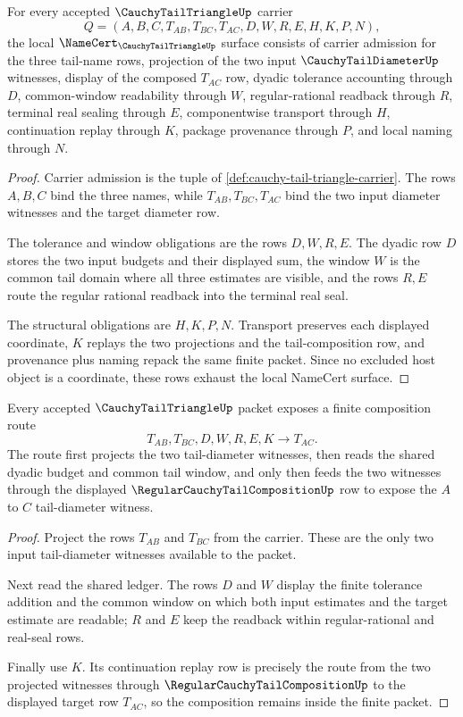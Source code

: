 \begin{theorem}
\label{thm:cauchy-tail-triangle-namecert-obligations}
For every accepted $\CauchyTailTriangleUp$ carrier
$$
Q=(A,B,C,T_{AB},T_{BC},T_{AC},D,W,R,E,H,K,P,N),
$$
the local $\NameCert_{\CauchyTailTriangleUp}$ surface consists of carrier admission for the three tail-name rows, projection of the two input $\CauchyTailDiameterUp$ witnesses, display of the composed $T_{AC}$ row, dyadic tolerance accounting through $D$, common-window readability through $W$, regular-rational readback through $R$, terminal real sealing through $E$, componentwise transport through $H$, continuation replay through $K$, package provenance through $P$, and local naming through $N$.
\end{theorem}
\begin{proof}
Carrier admission is the tuple of \autoref{def:cauchy-tail-triangle-carrier}. The rows $A,B,C$ bind the three names, while $T_{AB},T_{BC},T_{AC}$ bind the two input diameter witnesses and the target diameter row.

The tolerance and window obligations are the rows $D,W,R,E$. The dyadic row $D$ stores the two input budgets and their displayed sum, the window $W$ is the common tail domain where all three estimates are visible, and the rows $R,E$ route the regular rational readback into the terminal real seal.

The structural obligations are $H,K,P,N$. Transport preserves each displayed coordinate, $K$ replays the two projections and the tail-composition row, and provenance plus naming repack the same finite packet. Since no excluded host object is a coordinate, these rows exhaust the local NameCert surface.
\end{proof}

\begin{theorem}
\label{thm:cauchy-tail-triangle-composition}
Every accepted $\CauchyTailTriangleUp$ packet exposes a finite composition route
$$
T_{AB},T_{BC},D,W,R,E,K \longrightarrow T_{AC}.
$$
The route first projects the two tail-diameter witnesses, then reads the shared dyadic budget and common tail window, and only then feeds the two witnesses through the displayed $\RegularCauchyTailCompositionUp$ row to expose the $A$ to $C$ tail-diameter witness.
\end{theorem}
\begin{proof}
Project the rows $T_{AB}$ and $T_{BC}$ from the carrier. These are the only two input tail-diameter witnesses available to the packet.

Next read the shared ledger. The rows $D$ and $W$ display the finite tolerance addition and the common window on which both input estimates and the target estimate are readable; $R$ and $E$ keep the readback within regular-rational and real-seal rows.

Finally use $K$. Its continuation replay row is precisely the route from the two projected witnesses through $\RegularCauchyTailCompositionUp$ to the displayed target row $T_{AC}$, so the composition remains inside the finite packet.
\end{proof}

